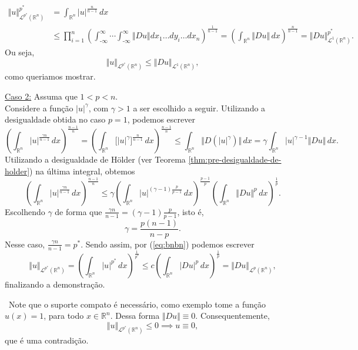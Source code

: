 \documentclass[a4paper, 11pt]{book}
\theoremstyle{definition}
\newcommand{\obs}{\noindent{\textbf{\textcolor{black}{\sffamily Observação:}}}~}
\newcommand{\m}{\text{-}}
\newcommand{\bR}{\mathbb{R}}
\newcommand{\cL}{\mathcal{L}}
\begin{document}
\begin{prf}
\[\begin{aligned}
            \Vert u \Vert_{\cL^{p^*}(\bR^n)}^{p^*} &= \int_{\bR^n} |u|^{\frac{n}{n-1}} \, dx \\
            &\leqslant \prod_{i=1}^n \left( \int_{\m\infty}^{\infty} \cdots \int_{\m\infty}^\infty \Vert Du \Vert dx_1\dots dy_i \dots dx_n \right)^{\frac{1}{n-1}}
            = \left(\int_{\bR^n} \Vert Du \Vert\,dx\right)^{\frac{n}{n-1}} = \Vert Du \Vert_{\cL^1(\bR^n)}^{p^*}.
        \end{aligned}
    \]
    Ou seja,
    \begin{equation} \label{eq:desigualdadegnss}
        \Vert u \Vert_{\cL^{p^*}(\bR^n)} \leqslant\Vert Du \Vert_{\cL^1(\bR^n)},
    \end{equation}
    como queriamos mostrar.

    \underline{Caso 2:} Assuma que $1 < p < n$.\\
    Considere a função $|u|^\gamma$, com $\gamma > 1$ a ser escolhido a seguir. Utilizando a desigualdade obtida no caso $p = 1$, podemos escrever
    \[
        \left( \int_{\bR^n} |u|^{\frac{\gamma n}{n - 1}}  \, dx\right)^{\frac{n-1}{n}} = \left( \int_{\bR^n} \Big[ |u|^\gamma \Big]^{\frac{n}{n-1}} \,dx \right)^{\frac{n-1}{n}} \leqslant \int_{\bR^n} \Vert D(|u|^{\gamma}) \Vert \,dx = \gamma \int_{\bR^n} |u|^{\gamma-1} \Vert Du \Vert \,dx.
    \]
    Utilizando a desigualdade de Hölder (ver Teorema \ref{thm:pre-desigualdade-de-holder}) na última integral, obtemos
    \begin{equation} \label{eq:bnbn}
        \left( \int_{\bR^n} |u|^{\frac{\gamma n}{n - 1}}  \, dx\right)^{\frac{n-1}{n}} \leqslant \gamma\left( \int_{\bR^n} |u|^{(\gamma-1)\frac{p}{p-1}} \,dx \right)^{\frac{p-1}{p}} \left( \int_{\bR^n} \Vert Du \Vert^p \,dx \right)^{\frac{1}{p}}.
    \end{equation}
    Escolhendo $\gamma$ de forma que $\displaystyle\frac{\gamma n}{n - 1} = (\gamma -1)\frac{p}{p-1}$, isto é,
    \[
        \gamma = \frac{p(n-1)}{n-p}.
    \]
    Nesse caso, $\displaystyle\frac{\gamma n}{n-1} = p^*$. Sendo assim, por (\ref{eq:bnbn}) podemos escrever
    \[
        \Vert u \Vert_{\cL^{p^*}(\bR^n)} = \left( \int_{\bR^n} |u|^{p^*} \,dx \right)^{\frac{1}{p^*}} \leqslant c \left( \int_{\bR^n} |Du|^p \,dx\right)^{\frac{1}{p}} = \Vert Du \Vert_{\cL^p(\bR^n)},
    \]
    finalizando a demonstração.
\end{prf}

\obs Note que o suporte compato é necessário, como exemplo tome a função $u(x) = 1$, para todo $x \in \bR^n$. Dessa forma $\Vert Du \Vert \equiv 0$. Consequentemente,
\[
    \Vert u \Vert_{\cL^{p^*}(\bR^n)} \leqslant 0 \implies u \equiv 0,
\]
que é uma contradição.
\end{document}
